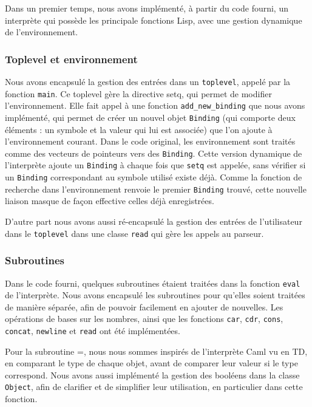 \documentclass[a4paper,11pt]{article}
\begin{document}
Dans un premier temps, nous avons implémenté, à partir du code fourni, un interprète 
qui possède les principale fonctions Lisp, avec une gestion dynamique de l'environnement.

\subsubsection{Toplevel et environnement}

  Nous avons encapsulé la gestion des entrées dans un \texttt{toplevel}, 
 appelé par la fonction \texttt{main}. Ce toplevel gère la directive setq, qui
 permet de modifier l'environnement. 
 Elle fait appel à une fonction \texttt{add\_new\_binding} que nous avons
 implémenté, qui permet de créer un nouvel objet
  \texttt{Binding} (qui comporte deux éléments : un
 symbole et la valeur qui lui est associée) que l'on ajoute à l'environnement courant. 
 Dans le code original, les environnement sont traités comme des vecteurs de pointeurs 
 vers des
 \texttt{Binding}.  Cette version dynamique de l'interprète ajoute un \texttt{Binding} 
 à chaque fois que \texttt{setq} est appelée, sans vérifier si un \texttt{Binding} 
 correspondant au symbole utilisé existe déjà. Comme la fonction de recherche dans 
 l'environnement renvoie le premier \texttt{Binding} trouvé, cette nouvelle liaison
 masque de façon effective celles déjà enregistrées.
 
 D'autre part nous avons aussi ré-encapsulé la gestion des entrées de l'utilisateur 
 dans le \texttt{toplevel} dans une classe \texttt{read} qui gère les appels au parseur.
 
 \subsubsection{Subroutines}
 
  Dans le code fourni, quelques subroutines étaient traitées dans la fonction 
  \texttt{eval} de l'interprète. Nous avons encapsulé les subroutines pour qu'elles soient 
  traitées de manière séparée, afin de pouvoir facilement en ajouter de nouvelles. 
  Les opérations de bases sur les nombres, ainsi que les fonctions \texttt{car}, 
  \texttt{cdr}, \texttt{cons}, \texttt{concat}, \texttt{newline} et \texttt{read} 
  ont été implémentées.
  
  Pour la subroutine =, nous nous sommes inspirés de l’interprète Caml vu en TD, en 
  comparant le type de chaque objet, avant de comparer leur valeur si le type 
  correspond. Nous avons aussi implémenté la gestion des booléens dans la classe 
  \texttt{Object}, afin de clarifier et de simplifier leur utilisation, en 
  particulier dans cette fonction.
  
\end{document}
